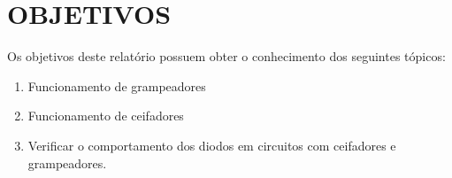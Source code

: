 \chapter{OBJETIVOS}

Os objetivos deste relatório possuem obter o conhecimento dos seguintes tópicos:

\begin{enumerate}
    \item Funcionamento de grampeadores
    \item Funcionamento de ceifadores
    \item Verificar o comportamento dos diodos em circuitos com ceifadores e grampeadores.
\end{enumerate}